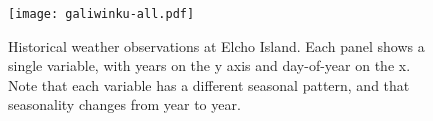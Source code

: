 \begin{figure}[p]
    \centering
    \texttt{[image: galiwinku-all.pdf]}
    \caption[Historical weather observations at Elcho Island]{
        Historical weather observations at Elcho Island.  Each panel shows a single variable, with years on the y axis and day-of-year on the x.
        Note that each variable has a different seasonal pattern, and that seasonality changes from year to year.}
    \label{fig:observation-panels}
\end{figure}

\begin{landscape}
\begin{table}

\end{table}
\end{landscape}

